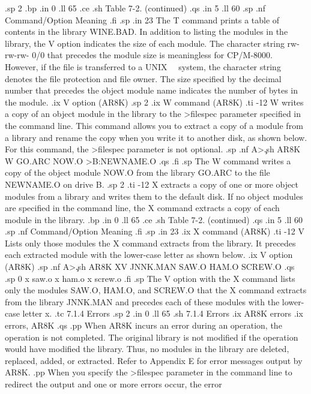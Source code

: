 .sp 2
.bp
.in 0
.ll 65
.ce
.sh
Table 7-2.  (continued)
.qs
.in 5
.ll 60
.sp
.nf
Command/Option                   Meaning
.fi
.sp
.in 23
The T command prints a table of contents in the library WINE.BAD.
In addition to listing the modules in the library, the V option
indicates the size of each module.  The character string rw-rw-rw-
0/0 that precedes the module size is meaningless for CP/M-8000.
However, if the file is transferred to a UNIX \ \ system, the 
character string denotes the file protection and file 
owner.  The size
specified by the decimal number that precedes the object module name
indicates the number of bytes in the module. 
.ix V option (AR8K)
.sp 2
.ix W command (AR8K)
.ti -12
W           writes a copy of an object module in the library to the
>filespec parameter specified in the command line.  This command
allows you to extract a copy of a module from a library and
rename the copy when you write it to another disk, as shown below.
For this command, the >filespec parameter is not optional.
.sp
.nf
A>\c
.sh
AR8K W GO.ARC NOW.O >B:NEWNAME.O
.qs
.fi
.sp
The W command writes a copy of 
the object module NOW.O from the library GO.ARC to the 
file NEWNAME.O on drive B.
.sp 2
.ti -12
X           extracts a copy of one or more object modules from a library
and writes them to the default disk.  If no object modules are
specified in the command line, the X command extracts a copy of
each module in the library. 
.bp
.in 0
.ll 65
.ce
.sh
Table 7-2.  (continued)
.qs
.in 5
.ll 60
.sp
.nf
Command/Option                   Meaning
.fi
.sp
.in 23
.ix X command (AR8K)
.ti -12
V           Lists only those modules the X command extracts from the 
library.  It precedes each extracted module with the lower-case 
letter as shown below. 
.ix V option (AR8K)
.sp
.nf
A>\c
.sh
AR8K XV JNNK.MAN SAW.O HAM.O SCREW.O
.qs
.sp 0
x saw.o
x ham.o
x screw.o
.fi
.sp
The V option with the X command lists only the modules SAW.O,
HAM.O, and SCREW.O that the X command extracts from the library
JNNK.MAN and precedes each of these modules with the lower-case
letter x. 
.tc         7.1.4  Errors
.sp 2
.in 0
.ll 65
.sh 
7.1.4  Errors
.ix AR8K errors
.ix errors, AR8K
.qs 
.pp
When AR8K incurs an error during an operation, the 
operation is not completed.  The original library is not modified
if the operation would have modified the library.  Thus, no modules
in the library are deleted, replaced, added, or extracted.
Refer to Appendix E for error messages output by AR8K.
.pp
When you specify the >filespec parameter in the command line to
redirect the output and one or more errors occur, the error 
